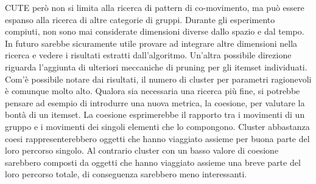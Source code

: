 CUTE però non si limita alla ricerca di pattern di co-movimento, ma può essere espanso alla ricerca di altre categorie di gruppi.
Durante gli esperimento compiuti, non sono mai considerate dimensioni diverse dallo spazio e dal tempo.
In futuro sarebbe sicuramente utile provare ad integrare altre dimensioni nella ricerca e vedere i risultati estratti dall'algoritmo.
Un'altra possibile direzione riguarda l'aggiunta di ulteriori meccaniche di pruning per gli itemset individuati.
Com'è possibile notare dai risultati, il numero di cluster per parametri ragionevoli è comunque molto alto.
Qualora sia necessaria una ricerca più fine, si potrebbe pensare ad esempio di introdurre una nuova metrica, la coesione, per valutare la bontà di un itemset.
La coesione esprimerebbe il rapporto tra i movimenti di un gruppo e i movimenti dei singoli elementi che lo compongono.
Cluster abbastanza coesi rappresenterebbero oggetti che hanno viaggiato assieme per buona parte del loro percorso singolo.
Al contrario cluster con un basso valore di coesione sarebbero composti da oggetti che hanno viaggiato assieme una breve parte del loro percorso totale, di conseguenza sarebbero meno interessanti.